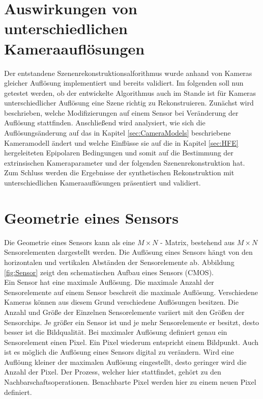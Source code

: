 \section{Auswirkungen von unterschiedlichen Kameraauflösungen}
\label{sec:minimalAuf} 

Der entstandene Szenenrekonstruktionsalforithmus wurde anhand von Kameras gleicher Auflösung implementiert und bereits validiert. Im folgenden soll nun getestet werden, ob der entwickelte Algorithmus auch im Stande ist für Kameras unterschiedlicher Auflösung eine Szene richtig zu Rekonstruieren. Zunächst wird beschrieben, welche Modifizierungen auf einem Sensor bei Veränderung der Auflösung stattfinden. Anschließend wird analysiert, wie sich die Auflösungsänderung auf das in Kapitel \ref{sec:CameraModels} beschriebene Kameramodell ändert und welche Einflüsse sie auf die in Kapitel \ref{sec:HFE} hergeleiteten Epipolaren Bedingungen und somit auf die Bestimmung der extrinsischen Kameraparameter und der folgenden Szenenrekonstruktion hat. Zum Schluss werden die Ergebnisse der synthetischen Rekonstruktion mit unterschiedlichen Kameraauflösungen präsentiert und validiert.
 

\section{Geometrie eines Sensors}


Die Geometrie eines Sensors kann als eine  $M \times N$ - Matrix, bestehend aus $M \times N$ Sensorelementen dargestellt werden\cite{Photonik}. Die Auflösung eines Sensors hängt von den horizontalen und vertikalen Abständen der Sensorelemente ab. Abbildung \ref{fig:Sensor} zeigt den schematischen Aufbau eines Sensors (CMOS). \\


Ein Sensor hat eine maximale Auflösung. Die maximale Anzahl der Sensorelemente auf einem Sensor beschreit die maximale Auflösung. Verschiedene Kameras können aus diesem Grund verschiedene Auflösungen besitzen. Die Anzahl und Größe der Einzelnen Sensorelemente variiert mit den Größen der Sensorchips. Je größer ein Sensor ist und je mehr Sensorelemente er besitzt, desto besser ist die Bildqualität\cite{Photonik}. Bei maximaler Auflösung definiert genau ein Sensorelement einen Pixel. Ein Pixel wiederum entspricht einem Bildpunkt\cite{Photonik}. Auch ist es möglich die Auflösung eines Sensors digital zu verändern. Wird eine Auflöung kleiner der maximalen Auflösung eingestellt, desto geringer wird die Anzahl der Pixel. Der Prozess, welcher hier stattfindet, gehört zu den Nachbarschaftsoperationen. Benachbarte Pixel werden hier zu einem neuen Pixel definiert\cite{Photonik}.\\


